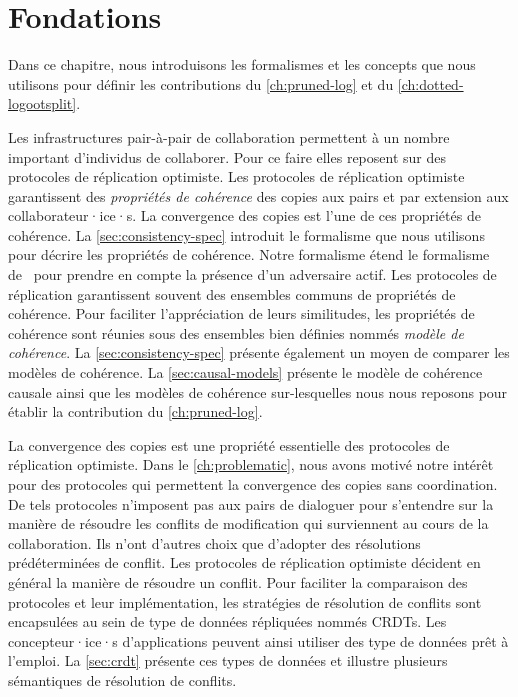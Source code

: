 
\chapter{Fondations}\label{ch:background}

\minitoc{}
\bigskip

Dans ce chapitre, nous introduisons les formalismes et les concepts que nous utilisons pour définir les contributions du \autoref{ch:pruned-log} et du \autoref{ch:dotted-logootsplit}.

Les infrastructures pair-à-pair de collaboration permettent à un nombre important d'individus de collaborer.
Pour ce faire elles reposent sur des protocoles de réplication optimiste.
Les protocoles de réplication optimiste garantissent des \emph{propriétés de cohérence} des copies aux pairs et par extension aux collaborateur·ice·s.
La convergence des copies est l'une de ces propriétés de cohérence.
La \autoref{sec:consistency-spec} introduit le formalisme que nous utilisons pour décrire les propriétés de cohérence.
Notre formalisme étend le formalisme de~\textcite{burckhardt_eventualconsistency_2014} pour prendre en compte la présence d'un adversaire actif.
Les protocoles de réplication garantissent souvent des ensembles communs de propriétés de cohérence.
Pour faciliter l'appréciation de leurs similitudes, les propriétés de cohérence sont réunies sous des ensembles bien définies nommés \emph{modèle de cohérence}.
La \autoref{sec:consistency-spec} présente également un moyen de comparer les modèles de cohérence.
La \autoref{sec:causal-models} présente le modèle de cohérence causale ainsi que les modèles de cohérence sur-lesquelles nous nous reposons pour établir la contribution du \autoref{ch:pruned-log}.

La convergence des copies est une propriété essentielle des protocoles de réplication optimiste.
Dans le \autoref{ch:problematic}, nous avons motivé notre intérêt pour des protocoles qui permettent la convergence des copies sans coordination.
De tels protocoles n'imposent pas aux pairs de dialoguer pour s'entendre sur la manière de résoudre les conflits de modification qui surviennent au cours de la collaboration.
Ils n'ont d'autres choix que d'adopter des résolutions prédéterminées de conflit.
Les protocoles de réplication optimiste décident en général la manière de résoudre un conflit.
Pour faciliter la comparaison des protocoles et leur implémentation, les stratégies de résolution de conflits sont encapsulées au sein de type de données répliquées nommés \acfp{CRDT}.
Les concepteur·ice·s d'applications peuvent ainsi utiliser des type de données prêt à l'emploi.
La \autoref{sec:crdt} présente ces types de données et illustre plusieurs sémantiques de résolution de conflits.

